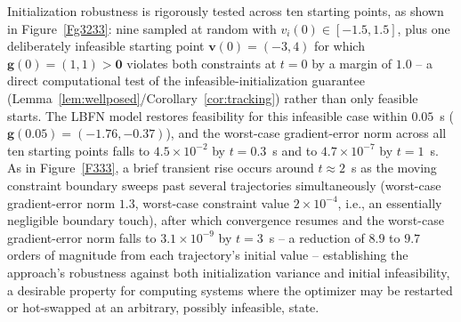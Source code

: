 \documentclass[pdflatex,sn-mathphys,Numbered]{sn-jnl}
\theoremstyle{thmstyleone}
\theoremstyle{thmstyletwo}
\theoremstyle{thmstylethree}
\begin{document}
Initialization robustness is rigorously tested across ten starting points, as shown in Figure~\ref{Fg3233}: nine sampled at random with $v_i(0)\in[-1.5,1.5]$, plus one deliberately infeasible starting point $\bm{v}(0)=(-3,4)$ for which $\bm{g}(0)=(1,1)>\bm{0}$ violates both constraints at $t=0$ by a margin of $1.0$ -- a direct computational test of the infeasible-initialization guarantee (Lemma~\ref{lem:wellposed}/Corollary~\ref{cor:tracking}) rather than only feasible starts. The LBFN model restores feasibility for this infeasible case within $0.05$~s ($\bm{g}(0.05)=(-1.76,-0.37)$), and the worst-case gradient-error norm across all ten starting points falls to $4.5\times10^{-2}$ by $t=0.3$~s and to $4.7\times10^{-7}$ by $t=1$~s. As in Figure~\ref{F333}, a brief transient rise occurs around $t\approx2$~s as the moving constraint boundary sweeps past several trajectories simultaneously (worst-case gradient-error norm $1.3$, worst-case constraint value $2\times10^{-4}$, i.e., an essentially negligible boundary touch), after which convergence resumes and the worst-case gradient-error norm falls to $3.1\times10^{-9}$ by $t=3$~s -- a reduction of $8.9$ to $9.7$ orders of magnitude from each trajectory's initial value -- establishing the approach's robustness against both initialization variance and initial infeasibility, a desirable property for computing systems where the optimizer may be restarted or hot-swapped at an arbitrary, possibly infeasible, state.
\end{document}
